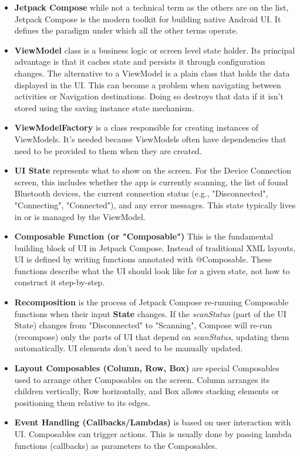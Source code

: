 \begin{itemize}
	\item \textbf{Jetpack Compose} while not a technical term as the others are on the list, Jetpack Compose is the modern toolkit for building native Android \ac{UI}. It defines the paradigm under which all the other terms operate.
	\item \textbf{ViewModel} class is a business logic or screen level state holder. Its principal advantage is that it caches state and persists it through configuration changes. The alternative to a ViewModel is a plain class that holds the data displayed in the \ac{UI}. This can become a problem when navigating between activities or Navigation destinations. Doing so destroys that data if it isn't stored using the saving instance state mechanism. 
	\item \textbf{ViewModelFactory} is a class responsible for creating instances of ViewModels. It's needed because ViewModels often have dependencies that need to be provided to them when they are created.
	\item \textbf{UI State} represents what to show on the screen. For the Device Connection screen, this includes whether the app is currently scanning, the list of found Bluetooth devices, the current connection status (e.g., "Disconnected", "Connecting", "Connected"), and any error messages. This state typically lives in or is managed by the ViewModel.
	\item \textbf{Composable Function (or "Composable")} This is the fundamental building block of \ac{UI} in Jetpack Compose. Instead of traditional XML layouts, \ac{UI} is defined by writing functions annotated with @Composable. These functions describe what the \ac{UI} should look like for a given state, not how to construct it step-by-step.
	\item \textbf{Recomposition} is the process of Jetpack Compose re-running Composable functions when their input \textbf{State} changes. If the \textit{scanStatus} (part of the \ac{UI} State) changes from "Disconnected" to "Scanning", Compose will re-run (recompose) only the parts of \ac{UI} that depend on \textit{scanStatus}, updating them automatically. \ac{UI} elements don't need to be manually updated.
	\item \textbf{Layout Composables (Column, Row, Box)} are special Composables used to arrange other Composables on the screen. Column arranges its children vertically, Row horizontally, and Box allows stacking elements or positioning them relative to its edges.
	\item \textbf{Event Handling (Callbacks/Lambdas)} is based on user interaction with \ac{UI}. Composables can trigger actions. This is usually done by passing lambda functions (callbacks) as parameters to the Composables.

\end{itemize}
